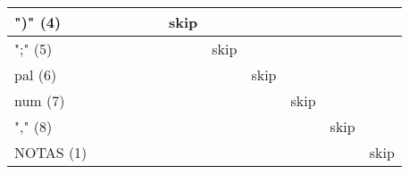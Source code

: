 \documentclass{article}
\begin{document}
\begin{table}
\begin{tabular}{|l|l|l|ll|l|l|l|l|l|}
    ")" (4)       & ~      & ~       & ~       & skip    & ~       & ~       & ~       & ~       & ~         \\ \hline
    ";" (5)       & ~      & ~       & ~       & ~       & skip    & ~       & ~       & ~       & ~         \\ \hline
    pal (6)       & ~      & ~       & ~       & ~       & ~       & skip    & ~       & ~       & ~         \\ \hline
    num (7)       & ~      & ~       & ~       & ~       & ~       & ~       & skip    & ~       & ~         \\ \hline
    "," (8)       & ~      & ~       & ~       & ~       & ~       & ~       & ~       & skip    & ~         \\ \hline
    NOTAS (1)     & ~      & ~       & ~       & ~       & ~       & ~       & ~       & ~       & skip      \\ \hline
    \end{tabular}
\end{table}
\end{document}
